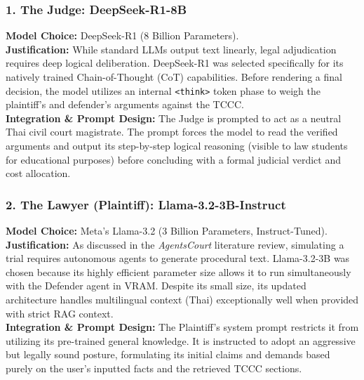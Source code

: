 \subsubsection{1. The Judge: DeepSeek-R1-8B}
\noindent\textbf{Model Choice:} DeepSeek-R1 (8 Billion Parameters). \\
\textbf{Justification:} While standard LLMs output text linearly, legal adjudication requires deep logical deliberation. DeepSeek-R1 was selected specifically for its natively trained Chain-of-Thought (CoT) capabilities. Before rendering a final decision, the model utilizes an internal \texttt{<think>} token phase to weigh the plaintiff's and defender's arguments against the TCCC. \\
\textbf{Integration \& Prompt Design:} The Judge is prompted to act as a neutral Thai civil court magistrate. The prompt forces the model to read the verified arguments and output its step-by-step logical reasoning (visible to law students for educational purposes) before concluding with a formal judicial verdict and cost allocation. 

\subsubsection{2. The Lawyer (Plaintiff): Llama-3.2-3B-Instruct}
\noindent\textbf{Model Choice:} Meta's Llama-3.2 (3 Billion Parameters, Instruct-Tuned). \\
\textbf{Justification:} As discussed in the \textit{AgentsCourt} literature review, simulating a trial requires autonomous agents to generate procedural text. Llama-3.2-3B was chosen because its highly efficient parameter size allows it to run simultaneously with the Defender agent in VRAM. Despite its small size, its updated architecture handles multilingual context (Thai) exceptionally well when provided with strict RAG context. \\
\textbf{Integration \& Prompt Design:} The Plaintiff's system prompt restricts it from utilizing its pre-trained general knowledge. It is instructed to adopt an aggressive but legally sound posture, formulating its initial claims and demands based purely on the user's inputted facts and the retrieved TCCC sections.

